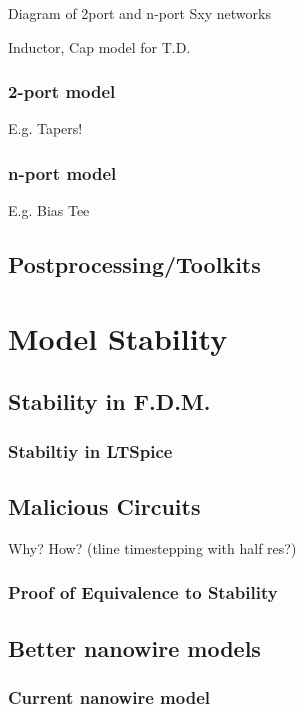 \documentclass{article}
\begin{document}
Diagram of 2port and n-port Sxy networks

Inductor, Cap model for T.D.

\subsubsection{2-port model}

E.g. Tapers!

\subsubsection{n-port model}

E.g. Bias Tee

\subsection{Postprocessing/Toolkits}

\section{Model Stability}

\subsection{Stability in F.D.M.}

\subsubsection{Stabiltiy in LTSpice}

\subsection{Malicious Circuits}

Why? How? (tline timestepping with half res?)

\subsubsection{Proof of Equivalence to Stability}

\subsection{Better nanowire models}

\subsubsection{Current nanowire model}
\end{document}
